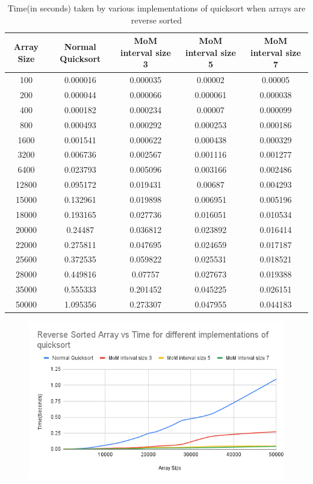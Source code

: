 \documentclass{report}
\begin{document}
\begin{table}[H]
\centering
\footnotesize %
\begin{tabular}{|c|c|c|c|c|}
\hline
\textbf{Array Size} & \textbf{Normal Quicksort} & \textbf{MoM interval size 3} & \textbf{MoM interval size 5} & \textbf{MoM interval size 7} \\ \hline
100    & 0.000016 & 0.000035 & 0.00002  & 0.00005  \\ \hline
200    & 0.000044 & 0.000066 & 0.000061 & 0.000038 \\ \hline
400    & 0.000182 & 0.000234 & 0.00007  & 0.000099 \\ \hline
800    & 0.000493 & 0.000292 & 0.000253 & 0.000186 \\ \hline
1600   & 0.001541 & 0.000622 & 0.000438 & 0.000329 \\ \hline
3200   & 0.006736 & 0.002567 & 0.001116 & 0.001277 \\ \hline
6400   & 0.023793 & 0.005096 & 0.003166 & 0.002486 \\ \hline
12800  & 0.095172 & 0.019431 & 0.00687  & 0.004293 \\ \hline
15000  & 0.132961 & 0.019898 & 0.006951 & 0.005196 \\ \hline
18000  & 0.193165 & 0.027736 & 0.016051 & 0.010534 \\ \hline
20000  & 0.24487  & 0.036812 & 0.023892 & 0.016414 \\ \hline
22000  & 0.275811 & 0.047695 & 0.024659 & 0.017187 \\ \hline
25600  & 0.372535 & 0.059822 & 0.025531 & 0.018521 \\ \hline
28000  & 0.449816 & 0.07757  & 0.027673 & 0.019388 \\ \hline
35000  & 0.555333 & 0.201452 & 0.045225 & 0.026151 \\ \hline
50000  & 1.095356 & 0.273307 & 0.047955 & 0.044183 \\ \hline
\end{tabular}
\caption{Time(in seconds) taken by various implementations of quicksort when arrays are reverse sorted}
\label{table:quicksort_comparison_3}
\end{table}

\begin{figure}[H]
\centering
\includegraphics[scale=0.6]{reversesortedvstime.png}

\end{figure}
\end{document}
